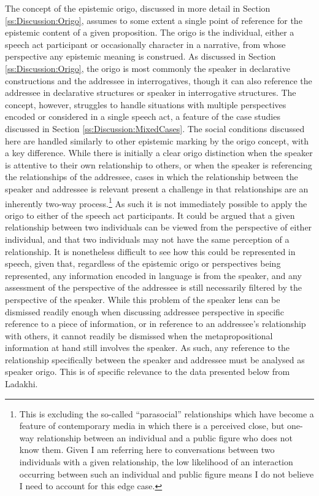 The concept of the epistemic origo, discussed in more detail in Section \ref{ss:Discussion:Origo}, assumes to some extent a single point of reference for the epistemic content of a given proposition. The origo is the individual, either a speech act participant or occasionally character in a narrative, from whose perspective any epistemic meaning is construed. As discussed in Section \ref{ss:Discussion:Origo}, the origo is most commonly the speaker in declarative constructions and the addressee in interrogatives, though it can also reference the addressee in declarative structures or speaker in interrogative structures. The concept, however, struggles to handle situations with multiple perspectives encoded or considered in a single speech act, a feature of the case studies discussed in Section \ref{ss:Discussion:MixedCases}. The social conditions discussed here are handled similarly to other epistemic marking by the origo concept, with a key difference. While there is initially a clear origo distinction when the speaker is attentive to their own relationship to others, or when the speaker is referencing the relationships of the addressee, cases in which the relationship between the speaker and addressee is relevant present a challenge in that relationships are an inherently two-way process.\footnote{This is excluding the so-called ``parasocial'' relationships which have become a feature of contemporary media in which there is a perceived close, but one-way relationship between an individual and a public figure who does not know them. Given I am referring here to conversations between two individuals with a given relationship, the low likelihood of an interaction occurring between such an individual and public figure means I do not believe I need to account for this edge case.} As such it is not immediately possible to apply the origo to either of the speech act participants. It could be argued that a given relationship between two individuals can be viewed from the perspective of either individual, and that two individuals may not have the same perception of a relationship. It is nonetheless difficult to see how this could be represented in speech, given that, regardless of the epistemic origo or perspectives being represented, any information encoded in language is from the speaker, and any assessment of the perspective of the addressee is still necessarily filtered by the perspective of the speaker. While this problem of the speaker lens can be dismissed readily enough when discussing addressee perspective in specific reference to a piece of information, or in reference to an addressee's relationship with others, it cannot readily be dismissed when the metapropositional information at hand still involves the speaker. As such, any reference to the relationship specifically between the speaker and addressee must be analysed as speaker origo. This is of specific relevance to the data presented below from Ladakhi.

